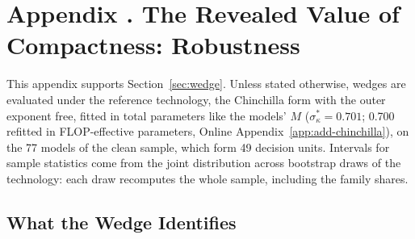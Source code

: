 
\section[The Revealed Value of Compactness: Robustness]{Appendix \thesection. The Revealed Value of Compactness: Robustness}\label{app:wedge}
\setlength{\emergencystretch}{2em}%

This appendix supports Section~\ref{sec:wedge}. Unless stated otherwise, wedges are evaluated under the reference
technology, the Chinchilla form with the outer exponent free, fitted in total parameters like the models' $M$
($\sigma^*_\kappa=0.701$; 0.700 refitted in FLOP-effective parameters, Online Appendix~\ref{app:add-chinchilla}), on the
77 models of the clean sample, which form 49 decision units. Intervals for sample statistics come from the joint
distribution across bootstrap draws of the technology: each draw recomputes the whole sample, including the family
shares.

\subsection{What the Wedge Identifies}\label{app:wedge-cases}

